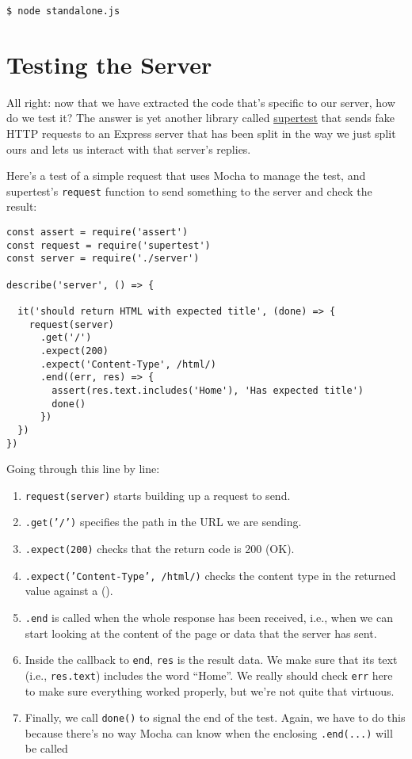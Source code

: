 \begin{verbatim}
$ node standalone.js
\end{verbatim}

\section{Testing the Server}\label{s:testing-server}

All right:
now that we have extracted the code that's specific to our server,
how do we test it?
The answer is yet another library called \href{https://github.com/visionmedia/supertest}{supertest}
that sends fake HTTP requests to an Express server
that has been split in the way we just split ours
and lets us interact with that server's replies.


Here's a test of a simple request that uses Mocha to manage the test,
and supertest's \texttt{request} function to send something to the server
and check the result:

\begin{verbatim}
const assert = require('assert')
const request = require('supertest')
const server = require('./server')

describe('server', () => {

  it('should return HTML with expected title', (done) => {
    request(server)
      .get('/')
      .expect(200)
      .expect('Content-Type', /html/)
      .end((err, res) => {
        assert(res.text.includes('Home'), 'Has expected title')
        done()
      })
  })
})
\end{verbatim}

Going through this line by line:

\begin{enumerate}
\item
  \texttt{request(server)} starts building up a request to send.
\item
  \texttt{.get('/')} specifies the path in the URL we are sending.
\item
  \texttt{.expect(200)} checks that the return code is 200 (OK).
\item
  \texttt{.expect('Content-Type',\ /html/)}
  checks the content type in the returned value against
  a  ().
\item
  \texttt{.end} is called when the whole response has been received,
  i.e., when we can start looking at the content of the page or data
  that the server has sent.
\item
  Inside the callback to \texttt{end},
  \texttt{res} is the result data.
  We make sure that its text (i.e., \texttt{res.text}) includes the word ``Home''.
  We really should check \texttt{err} here to make sure everything worked properly,
  but we're not quite that virtuous.
\item
  Finally, we call \texttt{done()} to signal the end of the test.
  Again,
  we have to do this because there's no way Mocha can know
  when the enclosing \texttt{.end(...)} will be called
\end{enumerate}

